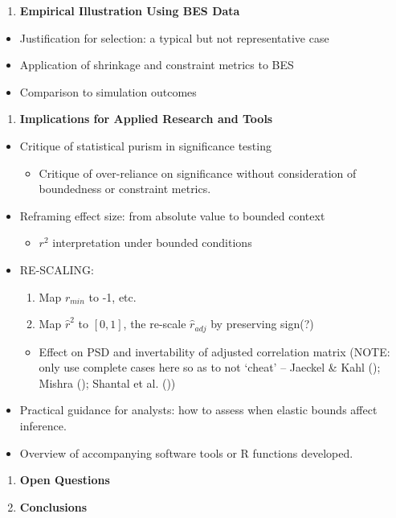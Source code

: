 \documentclass[
  12pt,
]{article}
\providecommand{\tightlist}{%
  \setlength{\itemsep}{0pt}\setlength{\parskip}{0pt}}\usepackage{longtable,booktabs,array}
\theoremstyle{plain}
\theoremstyle{definition}
\theoremstyle{remark}
\begin{document}
\begin{enumerate}
\def\labelenumi{\arabic{enumi}.}
\setcounter{enumi}{4}
\tightlist
\item
  \textbf{Empirical Illustration Using BES Data}
\end{enumerate}

\begin{itemize}
\tightlist
\item
  Justification for selection: a typical but not representative case
\item
  Application of shrinkage and constraint metrics to BES
\item
  Comparison to simulation outcomes
\end{itemize}

\begin{enumerate}
\def\labelenumi{\arabic{enumi}.}
\setcounter{enumi}{5}
\tightlist
\item
  \textbf{Implications for Applied Research and Tools}
\end{enumerate}

\begin{itemize}
\tightlist
\item
  Critique of statistical purism in significance testing

  \begin{itemize}
  \tightlist
  \item
    Critique of over-reliance on significance without consideration of
    boundedness or constraint metrics.
  \end{itemize}
\item
  Reframing effect size: from absolute value to bounded context

  \begin{itemize}
  \tightlist
  \item
    \(r^2\) interpretation under bounded conditions
  \end{itemize}
\item
  RE-SCALING:

  \begin{enumerate}
  \def\labelenumi{\arabic{enumi}.}
  \tightlist
  \item
    Map \(r_{min}\) to -1, etc.
  \item
    Map \(\hat{r}^2\) to \([0,1]\), the re-scale \(\hat{r}_{adj}\) by
    preserving sign(?)
  \end{enumerate}

  \begin{itemize}
  \tightlist
  \item
    Effect on PSD and invertability of adjusted correlation matrix
    (NOTE: only use complete cases here so as to not `cheat' -- Jaeckel
    \& Kahl (); Mishra
    (); Shantal et al.
    ())
  \end{itemize}
\item
  Practical guidance for analysts: how to assess when elastic bounds
  affect inference.
\item
  Overview of accompanying software tools or R functions developed.
\end{itemize}

\begin{enumerate}
\def\labelenumi{\arabic{enumi}.}
\setcounter{enumi}{6}
\item
  \textbf{Open Questions}
\item
  \textbf{Conclusions}
\end{enumerate}
\end{document}
